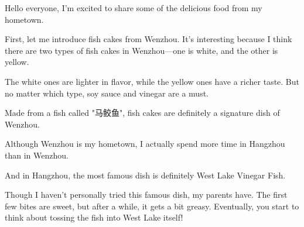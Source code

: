 \documentclass{ctexart}
\begin{document}
Hello everyone, I'm excited to share some of the delicious food from my hometown.

First, let me introduce fish cakes from Wenzhou. It's interesting because I think there are two types of fish cakes in Wenzhou—one is white, and the other is yellow.

The white ones are lighter in flavor, while the yellow ones have a richer taste. But no matter which type, soy sauce and vinegar are a must.

Made from a fish called "马鲛鱼", fish cakes are definitely a signature dish of Wenzhou.

Although Wenzhou is my hometown, I actually spend more time in Hangzhou than in Wenzhou.

And in Hangzhou, the most famous dish is definitely West Lake Vinegar Fish.

Though I haven’t personally tried this famous dish, my parents have. The first few bites are sweet, but after a while, it gets a bit greasy. Eventually, you start to think about tossing the fish into West Lake itself!
\end{document}
